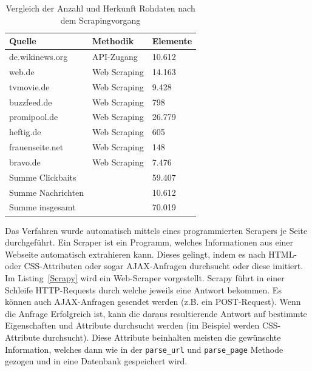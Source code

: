 \begin{table}[h]
    \caption{Vergleich der Anzahl und Herkunft Rohdaten nach dem Scrapingvorgang}
    \label{Datensatz_Herkunft}
    \renewcommand{\arraystretch}{1.2}
    \centering
    \sffamily
    \begin{footnotesize}
        \begin{tabular}{l l l}
            \toprule
            \textbf{Quelle}   & \textbf{Methodik} & Elemente \\
            \midrule
            de.wikinews.org   & API-Zugang        & 10.612   \\
            web.de            & Web Scraping      & 14.163   \\
            tvmovie.de        & Web Scraping      & 9.428    \\
            buzzfeed.de       & Web Scraping      & 798      \\
            promipool.de      & Web Scraping      & 26.779   \\
            heftig.de         & Web Scraping      & 605      \\
            frauenseite.net   & Web Scraping      & 148      \\
            bravo.de          & Web Scraping      & 7.476    \\
            \midrule
            Summe Clickbaits  &                   & 59.407   \\
            Summe Nachrichten &                   & 10.612   \\
            Summe insgesamt   &                   & 70.019   \\
            \bottomrule
        \end{tabular}
    \end{footnotesize}
    \rmfamily
\end{table}



Das Verfahren wurde automatisch mittels eines programmierten Scrapers je Seite durchgeführt. Ein Scraper ist ein Programm, welches Informationen aus einer Webseite automatisch extrahieren kann. Dieses gelingt, indem es nach HTML- oder CSS-Attributen oder sogar AJAX-Anfragen durchsucht oder diese imitiert. Im Listing~\ref{Scrapy} wird ein Web-Scraper vorgestellt. Scrapy führt in einer Schleife HTTP-Requests durch welche jeweils eine Antwort bekommen. Es können auch AJAX-Anfragen gesendet werden (z.B. ein POST-Request). Wenn die Anfrage Erfolgreich ist, kann die daraus resultierende Antwort auf bestimmte Eigenschaften und Attribute durchsucht werden (im Beispiel werden CSS-Attribute durchsucht). Diese Attribute beinhalten meisten die gewünschte Information, welches dann wie in der \texttt{parse\_url} und \texttt{parse\_page} Methode gezogen und in eine Datenbank gespeichert wird.



